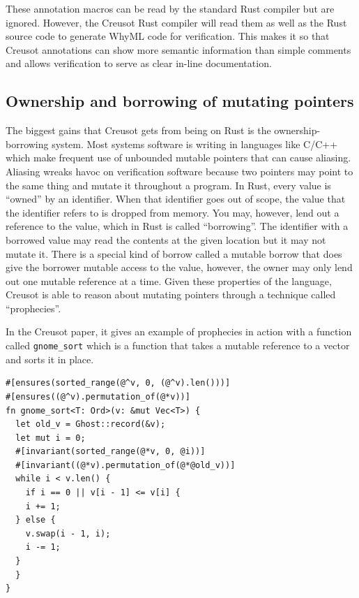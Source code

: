 \documentclass[12pt]{article}
\begin{document}
These annotation macros can be read by the standard Rust compiler but are ignored. 
However, the Creusot Rust compiler will read them as well as the Rust source code to generate WhyML code for verification. 
This makes it so that Creusot annotations can show more semantic information than simple comments and allows verification to serve as clear in-line documentation. 

\subsection{Ownership and borrowing of mutating pointers}
The biggest gains that Creusot gets from being on Rust is the ownership-borrowing system. 
Most systems software is writing in languages like C/C++ which make frequent use of unbounded mutable pointers that can cause aliasing. 
Aliasing wreaks havoc on verification software because two pointers may point to the same thing and mutate it throughout a program. 
In Rust, every value is ``owned'' by an identifier. When that identifier goes out of scope, the value that the identifier refers to is dropped from memory.
You may, however, lend out a reference to the value, which in Rust is called ``borrowing''. 
The identifier with a borrowed value may read the contents at the given location but it may not mutate it. 
There is a special kind of borrow called a mutable borrow that does give the borrower mutable access to the value, however, the owner may only lend out one mutable reference at a time.   
Given these properties of the language, Creusot is able to reason about mutating pointers through a technique called ``prophecies''.

In the Creusot paper, it gives an example of prophecies in action with a function called \texttt{gnome\_sort} which is a function that takes a mutable reference to a vector and sorts it in place. 

\begin{verbatim}
#[ensures(sorted_range(@^v, 0, (@^v).len()))]
#[ensures((@^v).permutation_of(@*v))]
fn gnome_sort<T: Ord>(v: &mut Vec<T>) {
  let old_v = Ghost::record(&v);
  let mut i = 0;
  #[invariant(sorted_range(@*v, 0, @i))]
  #[invariant((@*v).permutation_of(@*@old_v))]
  while i < v.len() {
    if i == 0 || v[i - 1] <= v[i] {
    i += 1;
  } else {
    v.swap(i - 1, i);
    i -= 1;
  }
  }
}
\end{verbatim} 
\end{document}
